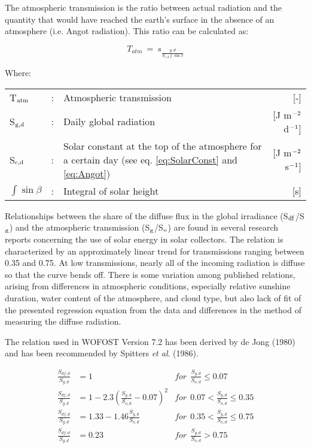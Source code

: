 The atmospheric transmission is the ratio between actual radiation and the quantity that
would have reached the earth's surface in the absence of an atmosphere (i.e. Angot
radiation). This ratio can be calculated as:

\begin{equation}
\label{eq:Tatm}
T _{atm} ~=~ s _{\frac{g,d}{S _{c,d} \int \sin \beta }}
\end{equation}

Where:\\[5pt]
\begin{tabularx}{\textwidth}{llXr}
	T$_{{\rm atm}}$ &:& Atmospheric transmission  & [-]\\
	S$_{{\rm g,d}}$ &:& Daily global radiation  & [J m$^{{\rm -2}}$ d$^{{\rm -1}}$]\\
	S$_{{\rm c,d}}$ &:& Solar constant at the top of the atmosphere for a certain day 
	(see eq. \ref{eq:SolarConst} and \ref{eq:Angot})  & [J m$^{{\rm -2}}$ s$^{{\rm -1}}$]\\
	$\int \sin \beta$  &:& Integral of solar height   & [s]\\
\end{tabularx}

Relationships between the share of the diffuse flux in the global irradiance 
(S$_{{\rm df}}$/S$_{{\rm g}}$) and the atmospheric transmission 
(S$_{{\rm g}}$/S$_{{\rm o}}$) are found in several research reports concerning the use
of solar energy in solar collectors. The relation is characterized by an approximately
linear trend for transmissions ranging between 0.35 and 0.75. At low transmissions,
nearly all of the incoming radiation is diffuse so that the curve bends off.
There is some variation among published relations, arising from differences in atmospheric 
conditions, especially relative sunshine duration, water content of the atmosphere,
and cloud type, but also lack of fit of the presented regression equation from the data and
differences in the method of measuring the diffuse radiation.

The relation used in WOFOST Version 7.2 has been derived by de Jong (1980) and has
been recommended by Spitters {\it et al}. (1986).

\begin{align}
\label{eq:irrad_diffuse}
{\frac{S _{df,d} }{S _{g, d} }} &= 1 & 
for ~~ {\frac{S _{g,d} }{S _{o,d} }} \le 0.07 \nonumber \\
{\frac{S _{df,d} }{S _{g,d} }} &= 1-2.3({\frac{S _{g,d} }{S _{o,d} }} -0.07) ^{2} & 
for ~~ 0.07 < {\frac{S _{g,d} }{S _{o,d} }} \le 0.35  \nonumber \\
{\frac{S _{df,d} }{S _{g,d} }} &= 1.33-1.46{\frac{S _{g,d} }{S _{o,d} }} &
for ~~ 0.35 < {\frac{S _{g,d} }{S _{o,d} }} \le 0.75 \nonumber \\
{\frac{S _{df,d} }{S _{g,d} }} &= 0.23 &
for ~~ {\frac{S _{g,d} }{S _{o,d} }} > 0.75 \nonumber \\
\end{align}

